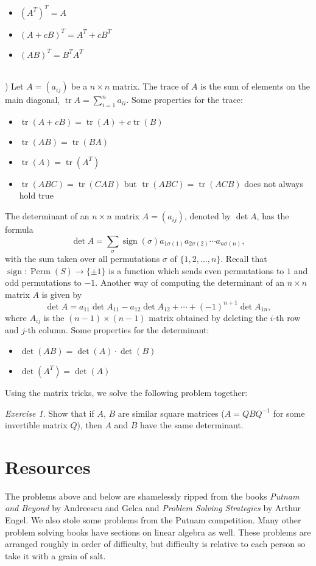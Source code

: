 \documentclass{article}
\theoremstyle{definition}
\theoremstyle{remark}
\newtheorem{exercise}{Exercise}
\DeclareMathOperator{\Perm}{Perm}
\DeclareMathOperator{\tr}{tr}
\DeclareMathOperator{\sign}{sign}
\begin{document}
\begin{itemize}
    \item $(A^{T})^{T} = A$
    \item $(A + cB)^{T} = A^{T} + cB^{T}$
    \item $(AB)^{T} = B^{T}A^{T}$ 
\end{itemize}
\leavevmode
\\
) Let $A = (a_{ij})$ be a $n \times n$ matrix. The trace of $A$ is the sum of elements on the main diagonal, $\tr A = \sum_{i = 1}^{n} a_{ii}$. Some properties for the trace: 
\begin{itemize}
    \item $\tr(A + cB) = \tr(A) + c\tr(B)$
    \item $\tr(AB) = \tr(BA)$
    \item $\tr(A) = \tr(A^{T})$
    \item $\tr(ABC) = \tr(CAB)$ but $\tr(ABC) = \tr(ACB)$ does not always hold true
\end{itemize}

\noindent The determinant of an $n \times n$ matrix $A = (a_{ij})$, denoted by $\det A$, has the formula 
\[\det A = \sum_{\sigma} \sign(\sigma) a_{1 \sigma(1)} a_{2 \sigma(2)} \cdots a_{n \sigma(n)},  
\]
with the sum taken over all permutations $\sigma$ of $\{1, 2, \ldots, n\}$. Recall that $\sign: \Perm(S) \rightarrow \{\pm{1}\}$ is a function which sends even permutations to $1$ and odd permutations to $-1$. Another way of computing the determinant of an $n \times n$ matrix $A$ is given by
\[\det A = a_{11} \det A_{11} - a_{12} \det A_{12} + \cdots + (-1)^{n + 1} \det A_{1n}, 
\]
where $A_{ij}$ is the $(n - 1) \times (n - 1)$ matrix obtained by deleting the $i$-th row and $j$-th column. Some properties for the determinant: 
\begin{itemize}
    \item $\det(AB) = \det(A) \cdot \det(B)$ 
    \item $\det(A^{T}) = \det(A)$
\end{itemize}

Using the matrix tricks, we solve the following problem together: 

\begin{exercise}
Show that if $A$, $B$ are similar square matrices ($A = QBQ^{-1}$ for some invertible matrix $Q$), then $A$ and $B$ have the same determinant.   
\end{exercise}

\section{Resources}
The problems above and below are shamelessly ripped from the books \textit{Putnam and Beyond} by Andreescu and Gelca and \textit{Problem Solving Strategies} by Arthur Engel. We also stole some problems from the Putnam competition. Many other problem solving books have sections on linear algebra as well. These problems are arranged roughly in order of difficulty, but difficulty is relative to each person so take it with a grain of salt.
\end{document}
